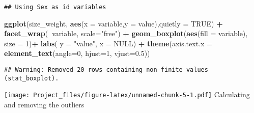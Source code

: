 \documentclass[
]{article}
\newenvironment{Shaded}{\begin{snugshade}}{\end{snugshade}}
\newcommand{\ControlFlowTok}[1]{\textcolor[rgb]{0.13,0.29,0.53}{\textbf{#1}}}
\newcommand{\DataTypeTok}[1]{\textcolor[rgb]{0.13,0.29,0.53}{#1}}
\newcommand{\DecValTok}[1]{\textcolor[rgb]{0.00,0.00,0.81}{#1}}
\newcommand{\FloatTok}[1]{\textcolor[rgb]{0.00,0.00,0.81}{#1}}
\newcommand{\KeywordTok}[1]{\textcolor[rgb]{0.13,0.29,0.53}{\textbf{#1}}}
\newcommand{\NormalTok}[1]{#1}
\newcommand{\OperatorTok}[1]{\textcolor[rgb]{0.81,0.36,0.00}{\textbf{#1}}}
\newcommand{\OtherTok}[1]{\textcolor[rgb]{0.56,0.35,0.01}{#1}}
\newcommand{\StringTok}[1]{\textcolor[rgb]{0.31,0.60,0.02}{#1}}
\begin{document}
\begin{verbatim}
## Using Sex as id variables
\end{verbatim}

\begin{Shaded}
\begin{Highlighting}[]
\KeywordTok{ggplot}\NormalTok{(size_weight, }\KeywordTok{aes}\NormalTok{(}\DataTypeTok{x =}\NormalTok{ variable,}\DataTypeTok{y =}\NormalTok{ value),}\DataTypeTok{quietly =} \OtherTok{TRUE}\NormalTok{) }\OperatorTok{+}\StringTok{ }\KeywordTok{facet_wrap}\NormalTok{(}\OperatorTok{~}\NormalTok{variable, }\DataTypeTok{scale=}\StringTok{"free"}\NormalTok{) }\OperatorTok{+}\StringTok{ }\KeywordTok{geom_boxplot}\NormalTok{(}\KeywordTok{aes}\NormalTok{(}\DataTypeTok{fill =}\NormalTok{ variable), }\DataTypeTok{size =} \DecValTok{1}\NormalTok{)}\OperatorTok{+}\StringTok{ }\KeywordTok{labs}\NormalTok{( }\DataTypeTok{y =} \StringTok{"value"}\NormalTok{, }\DataTypeTok{x =} \OtherTok{NULL}\NormalTok{) }\OperatorTok{+}\StringTok{ }\KeywordTok{theme}\NormalTok{(}\DataTypeTok{axis.text.x =} \KeywordTok{element_text}\NormalTok{(}\DataTypeTok{angle=}\DecValTok{0}\NormalTok{, }\DataTypeTok{hjust=}\DecValTok{1}\NormalTok{, }\DataTypeTok{vjust=}\FloatTok{0.5}\NormalTok{)) }
\end{Highlighting}
\end{Shaded}

\begin{verbatim}
## Warning: Removed 20 rows containing non-finite values (stat_boxplot).
\end{verbatim}

\texttt{[image: Project\_files/figure-latex/unnamed-chunk-5-1.pdf]}
Calculating and removing the outliers

\begin{Shaded}
\end{Shaded}
\end{document}
